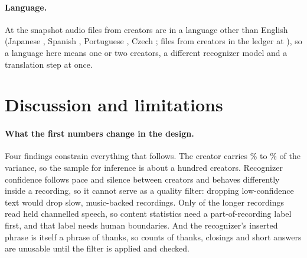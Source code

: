\documentclass[letterpaper]{article} %
\begin{document}
\paragraph{Language.} At the snapshot \SnapNonEnglish{} audio files from \SnapNonEnglishCreators{} creators are in a language other than English (Japanese \SnapJapanese, Spanish \SnapSpanish, Portuguese \SnapPortuguese, Czech \SnapCzech; \NowNonEnglish{} files from \NowNonEnglishCreators{} creators in the ledger at \NowStamp), so a language here means one or two creators, a different recognizer model and a translation step at once.

\section{Discussion and limitations}
\label{sec:limits}

\paragraph{What the first numbers change in the design.} Four findings constrain everything that follows. The creator carries \IccMinPct\% to \IccMaxPct\% of the variance, so the sample for inference is about a hundred creators. Recognizer confidence follows pace and silence between creators and behaves differently inside a recording, so it cannot serve as a quality filter: dropping low-confidence text would drop slow, music-backed recordings. Only \KindChannelled{} of the \ReadLongN{} longer recordings read held channelled speech, so content statistics need a part-of-recording label first, and that label needs human boundaries. And the recognizer's inserted phrase is itself a phrase of thanks, so counts of thanks, closings and short answers are unusable until the filter is applied and checked.
\end{document}

